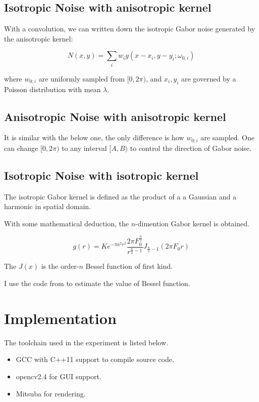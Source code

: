 \documentclass[journal, a4paper]{IEEEtran}
\begin{document}
\subsection{Isotropic Noise with anisotropic kernel}
  With a convolution, we can written down the isotropic Gabor noise generated by the
  anisotropic kernel: 

  $$
    N(x, y) = \sum_{i}w_ig(x - x_i, y - y_i;\omega_{0, i})
  $$

  where $w_{0;i}$ are uniformly sampled from $[0, 2\pi)$, and $x_i, y_i$ are governed by 
  a Poisson distribution with mean $\lambda$. 

\subsection{Anisotropic Noise with anisotropic kernel}
  It is similar with the below one, the only difference is how $w_{0;i}$ are sampled. 
  One can change $[0, 2\pi)$ to any interval $[A, B)$ to control the direction of Gabor noise.

\subsection{Isotropic Noise with isotropic kernel}
  The isotropic Gabor kernel is defined as the product of a a Gaussian and
  a harmonic in spatial domain. 

  With some mathematical deduction, the $n$-dimention Gabor kernel is obtained. 

  $$
    g(r) = Ke^{-\pi a^2 r^2}\frac{2\pi F_0^{\frac{n}{2}}}{r^{\frac{n}{2} - 1}}J_{\frac{n}{2} - 1}(2\pi F_0 r)
  $$

  The $J(x)$ is the order-$n$ Bessel function of first kind.

  I use the code from \cite{press1996numerical} to estimate the value of Bessel function.

\section{Implementation}
  The toolchain used in the experiment is listed below.
  \begin{itemize}
    \item GCC with C++11 support to compile source code. 
    \item opencv2.4 for GUI support.
    \item Mitsuba for rendering.
  \end{itemize}
\end{document}
